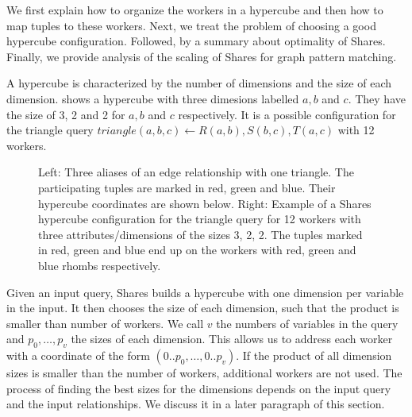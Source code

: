 We first explain how to organize the workers in a hypercube and then how to map tuples to these workers.
Next, we treat the problem of choosing a good hypercube configuration.
Followed, by a summary about optimality of Shares.
Finally, we provide analysis of the scaling of Shares for graph pattern matching.

A hypercube is characterized by the number of dimensions and the size of each dimension.
 shows a hypercube with three dimesions labelled $a, b$ and $c$.
They have the size of 3, 2 and 2 for $a, b$ and $c$ respectively.
It is a possible configuration for the triangle query $triangle(a, b, c) \leftarrow R(a, b), S(b, c), T(a, c)$ with
12 workers.

\begin{figure}
    \centering
    \hspace{0.04\textwidth}
    \caption{
      Left: Three aliases of an edge relationship with one triangle.
        The participating tuples are marked in red, green and blue.
        Their hypercube coordinates are shown below.
      Right: Example of a Shares hypercube configuration for the triangle query for 12 workers with three attributes/dimensions of the sizes
        3, 2, 2.
        The tuples marked in red, green and blue end up on the workers with red, green and blue rhombs respectively.
    }
    \label{fig:hypercube}
\end{figure}

Given an input query, Shares builds a hypercube with one dimension per variable in the input.
It then chooses the size of each dimension, such that the product is smaller than number of workers.
We call $v$ the numbers of variables in the query and $p_0, \dots, p_v$ the sizes of each dimension.
This allows us to address each worker with a coordinate of the form $(0..p_0, \dots, 0..p_v)$.
If the product of all dimension sizes is smaller than the number of workers, additional workers are not used.
The process of finding the best sizes for the dimensions depends on the input query and the input relationships.
We discuss it in a later paragraph of this section.

